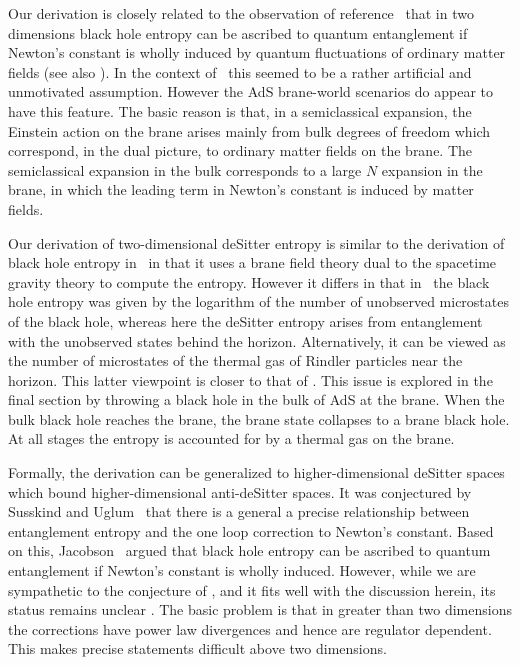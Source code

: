 Our derivation is closely related to the observation of reference 
\fpst\ that in two
dimensions black hole
entropy can be ascribed to quantum entanglement if
Newton's constant is wholly induced by quantum fluctuations of ordinary matter
fields (see also ). 
In the context of  \fpst\ this seemed to be a
rather artificial and unmotivated assumption. However
the AdS brane-world scenarios do appear to have this feature.
The basic reason is that, in a semiclassical expansion, 
 the Einstein action on the brane
arises mainly from bulk degrees of
freedom
which correspond, in the dual picture, to ordinary matter fields on the
brane.
The semiclassical expansion in the bulk corresponds to a large $N$ 
expansion in the brane, in which the leading term in 
Newton's constant is induced by matter fields. 

Our derivation of two-dimensional deSitter entropy 
is similar to the derivation of black hole entropy
in \ascv\ in that it uses a brane field theory dual to the
spacetime gravity theory to compute the entropy. However it
differs in that in \ascv\ the black hole entropy was given by the
logarithm of the number of unobserved microstates of the black hole, 
whereas here the deSitter entropy arises from
entanglement with the unobserved states behind the
horizon. Alternatively, it can be viewed as the number 
of microstates of the thermal 
gas of Rindler particles  near the horizon.  This latter viewpoint is 
closer to that of \ascv.  This issue is 
explored  in the final section by throwing a 
black hole in the bulk of AdS at the brane. When the bulk black
hole reaches the brane, the brane state collapses to a brane black hole. 
At all stages the entropy is accounted for 
by a thermal gas on the brane. 
 

Formally, the derivation can be generalized to higher-dimensional 
deSitter spaces which bound higher-dimensional anti-deSitter spaces. 
It was conjectured by Susskind and Uglum 
\su\ that there is a general a precise relationship 
between entanglement entropy and the one loop correction to Newton's
constant. Based on this, Jacobson \tj\ argued that black hole
entropy can be ascribed to quantum entanglement if
Newton's constant is wholly induced. However, 
while we are sympathetic to the conjecture of \su, and it fits well 
with the discussion herein, its status remains unclear . 
The basic problem is that in greater than two dimensions the 
corrections have power law divergences and hence are regulator 
dependent. This makes precise statements difficult above two dimensions.    

